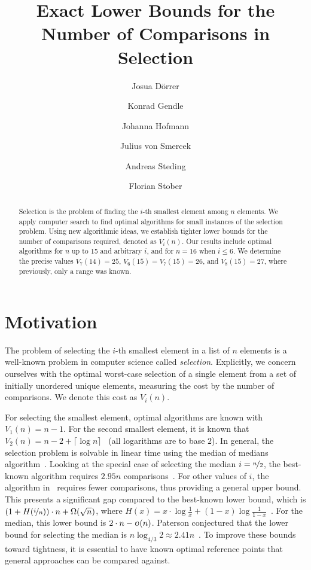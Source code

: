 \documentclass[a4paper,UKenglish,cleveref, autoref, thm-restate]{lipics-v2021}
\title{Exact Lower Bounds for the Number of Comparisons in Selection}
\author{Josua Dörrer}{University of Stuttgart, Germany}{}{}{}
\author{Konrad Gendle}{University of Stuttgart, Germany}{}{}{}
\author{Johanna Hofmann}{University of Stuttgart, Germany}{}{}{}
\author{Julius von Smercek}{University of Stuttgart, Germany}{}{}{}
\author{Andreas Steding}{University of Stuttgart, Germany}{}{}{}
\author{Florian Stober}{University of Stuttgart, Germany}{florian.stober@fmi.uni-stuttgart.de}{0000-0002-5516-6660}{}
\newcommand\smallO{
\mathchoice
{{\scriptstyle\mathcal{O}}}%
{{\scriptstyle\mathcal{O}}}%
{{\scriptscriptstyle\mathcal{O}}}%
{\scalebox{.50}{$\scriptscriptstyle\mathcal{O}$}}%
}
\begin{document}
\maketitle

\begin{abstract} \small\baselineskip=9pt
  Selection is the problem of finding the $i$-th smallest element among $n$ elements.
  We apply computer search to find optimal algorithms for small instances of the selection problem.
  Using new algorithmic ideas, we establish tighter lower bounds for the number of comparisons required, denoted as $V_i(n)$.
  Our results include optimal algorithms for $n$ up to 15 and arbitrary $i$, and for $n=16$ when $i \leq 6$.
  We determine the precise values $V_7(14) = 25$, $V_6(15) = V_7(15) = 26$, and $V_8(15) = 27$, where previously, only a range was known.

\end{abstract} %

\section{Motivation} \label{sec:motivation}

The problem of selecting the $i$-th smallest element in a list of $n$ elements is a well-known problem in computer science called \textit{selection}.
Explicitly, we concern ourselves with the optimal worst-case selection of a single element from a set of initially unordered unique elements, measuring the cost by the number of comparisons.
We denote this cost as $V_i(n)$.

For selecting the smallest element, optimal algorithms are known with $V_1(n) = n - 1$.
For the second smallest element, it is known that $V_2(n) = n - 2 + \lceil \log n\rceil$~\cite{Knuth1973} (all logarithms are to base $2$).
In general, the selection problem is solvable in linear time using the median of medians algorithm~\cite{Blum1972}.
Looking at the special case of selecting the median $i = \nicefrac{n}{2}$, the best-known algorithm requires $2.95n$ comparisons~\cite{dor1999selecting}.
For other values of $i$, the algorithm in~\cite{dor1999selecting} requires fewer comparisons, thus providing a general upper bound.
This presents a significant gap compared to the best-known lower bound, which is $\left (1 + H(\nicefrac{i}{n}) \right ) \cdot n + \Omega(\sqrt n)$, where $H(x) = x \cdot \log \frac{1}{x} + (1 - x) \log \frac{1}{1 - x}$~\cite{bent1985finding}.
For the median, this lower bound is $2 \cdot n - \smallO(n)$.
Paterson conjectured that the lower bound for selecting the median is $n \log_{4/3} 2 \approx 2.41n$~\cite{paterson1996progress}.
To improve these bounds toward tightness, it is essential to have known optimal reference points that general approaches can be compared against.
\end{document}
